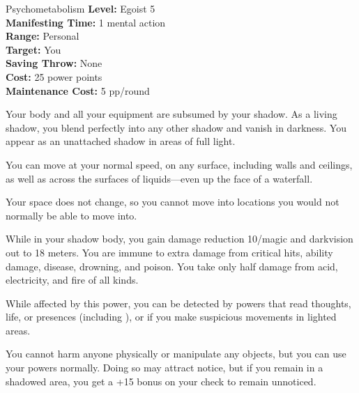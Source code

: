 {Psychometabolism}
{
	\textbf{Level:}
	Egoist 5\\
	\textbf{Manifesting Time:}
	1 mental action\\
	\textbf{Range:}
	Personal\\
	\textbf{Target:}
	You\\
	\textbf{Saving Throw:}
	None\\
	\textbf{Cost:}
	25 power points\\
	\textbf{Maintenance Cost:}
	5 pp/round\\
}
{
	Your body and all your equipment are subsumed by your shadow. As a living shadow, you blend perfectly into any other shadow and vanish in darkness. You appear as an unattached shadow in areas of full light.

	You can move at your normal speed, on any surface, including walls and ceilings, as well as across the surfaces of liquids---even up the face of a waterfall.

	Your space does not change, so you cannot move into locations you would not normally be able to move into.

	While in your shadow body, you gain damage reduction 10/magic and darkvision out to 18 meters. You are immune to extra damage from critical hits, ability damage, disease, drowning, and poison. You take only half damage from acid, electricity, and fire of all kinds.

	While affected by this power, you can be detected by powers that read thoughts, life, or presences (including ), or if you make suspicious movements in lighted areas.

	You cannot harm anyone physically or manipulate any objects, but you can use your powers normally. Doing so may attract notice, but if you remain in a shadowed area, you get a +15 bonus on your  check to remain unnoticed.
}